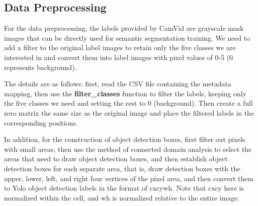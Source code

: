 \documentclass[conference]{IEEEtran}
\begin{document}
\subsection{Data Preprocessing}


For the data preprocessing, the labels provided by CamVid are grayscale mask images that can be directly used for semantic segmentation training. We need to add a filter to the original label images to retain only the five classes we are interested in and convert them into label images with pixel values of 0-5 (0 represents background).

The details are as follows: first, read the CSV file containing the metadata mapping, then use the \textbf{filter\_classes} function to filter the labels, keeping only the five classes we need and setting the rest to 0 (background). Then create a full zero matrix the same size as the original image and place the filtered labels in the corresponding positions.


In addition, for the construction of object detection boxes, first filter out pixels with small areas, then use the method of connected domain analysis to select the areas that need to draw object detection boxes, and then establish object detection boxes for each separate area, that is, draw detection boxes with the upper, lower, left, and right four vertices of the pixel area, and then convert them to Yolo object detection labels in the format of cxcywh. Note that cxcy here is normalized within the cell, and wh is normalized relative to the entire image.


\end{document}
